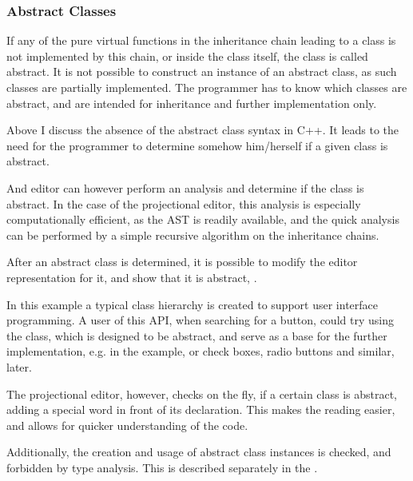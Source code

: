 \subsubsection{Abstract Classes}
\label{abstractclasses}

If any of the pure virtual functions in the inheritance chain leading to a class is not implemented by this chain, 
or inside the class itself, the class is called abstract. It is not possible to construct an instance of an
abstract class, as such classes are partially implemented. The programmer has to know which classes are abstract,
and are intended for inheritance and further implementation only.

Above I discuss the absence of the abstract class syntax in C++. It leads to the need for the programmer to 
determine somehow him/herself if a given class is abstract. 

And editor can however perform an analysis and determine if the class is abstract. In the case of the projectional
editor, this analysis is especially computationally efficient, as the AST is readily available, and the quick 
analysis can be performed by a simple recursive algorithm on the inheritance chains.

After an abstract class is determined, it is possible to modify the editor representation for it, and show that it is 
abstract, .

In this example a typical class hierarchy is created to support user interface programming. A user of this API, when 
searching for a button, could try using the  class, which is designed to be abstract, and serve as a 
base for the further implementation, e.g.  in the example, or check boxes, radio buttons and similar,
later.


The projectional editor, however, checks on the fly, if a certain class is abstract, adding a special  word 
in front of its declaration. This makes the reading easier, and allows for quicker understanding of the code. 

Additionally, the creation and usage of abstract class instances is checked, and forbidden by type analysis. This is 
described separately in the .